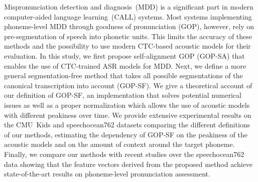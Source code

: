 Mispronunciation detection and diagnosis~(MDD) is a significant part in modern computer-aided language learning~(CALL) systems.
Most systems implementing phoneme-level MDD through goodness of pronunciation (GOP), however, rely on pre-segmentation of speech into phonetic units.
This limits the accuracy of these methods and the possibility to use modern CTC-based acoustic models for their evaluation.
In this study, we first propose self-alignment GOP (GOP-SA) that enables the use of CTC-trained ASR models for MDD.
Next, we define a more general segmentation-free method that takes all possible segmentations of the canonical transcription into account (GOP-SF).
We give a theoretical account of our definition of GOP-SF, an implementation that solves potential numerical issues as well as a proper normalization which allows the use of acoustic models with different peakiness over time.
We provide extensive experimental results on the CMU~Kids and speechocean762 datasets comparing the different definitions of our methods, estimating the dependency of GOP-SF on the peakiness of the acoustic models and on the amount of context around the target phoneme.
Finally, we compare our methods
with recent studies over the speechocean762 data
showing that the feature vectors derived from the proposed method achieve state-of-the-art results on phoneme-level pronunciation assessment. 

